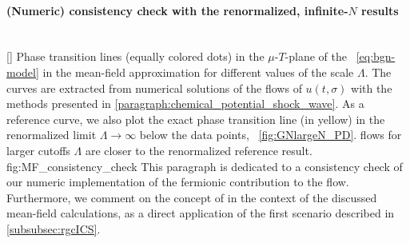\paragraph{(Numeric) consistency check with the renormalized, infinite-$N$ results}\label{paragraph:numeric_consistency_check_mean-field}\mbox{}\\%
	[]%
	{%
		Phase transition lines (equally colored dots) in the $\mu$-$T$-plane of the \gnym{}~\eqref{eq:bgn-model} in the mean-field approximation for different values of the \uv{} scale $\Lambda$. The curves are extracted from numerical solutions of the \frg{} flows of $u ( t, \sigma )$ with the methods presented in \cref{paragraph:chemical_potential_shock_wave}. As a reference curve, we also plot the exact phase transition line (in yellow) in the renormalized limit $\Lambda\rightarrow\infty$ below the data points, \cf{}\ \cref{fig:GNlargeN_PD}. \Frg{} flows for larger cutoffs $\Lambda$ are closer to the renormalized reference result.
	}%
	{fig:MF_consistency_check}%
This paragraph is dedicated to a consistency check of our numeric implementation of the fermionic contribution to the \frg{} flow.
Furthermore, we comment on the concept of \rgcy{} in the context of the discussed mean-field calculations, as a direct application of the first scenario described in \cref{subsubsec:rgcICS}.\bigskip
	

